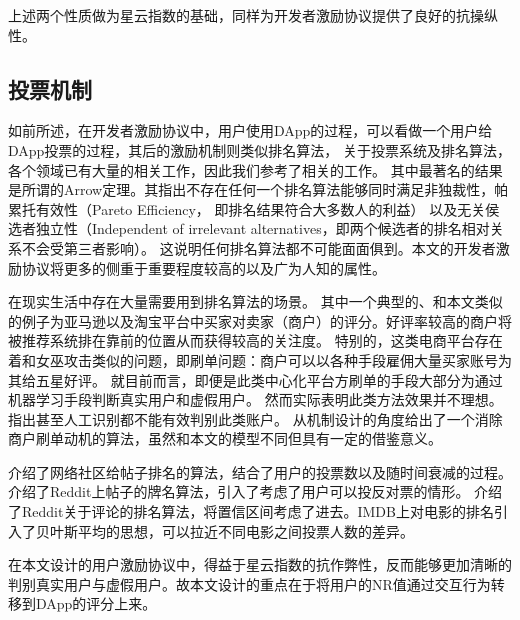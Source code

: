 \noindent 上述两个性质做为星云指数的基础，同样为开发者激励协议提供了良好的抗操纵性。

\subsection{投票机制}
如前所述，在开发者激励协议中，用户使用DApp的过程，可以看做一个用户给DApp投票的过程，其后的激励机制则类似排名算法，
关于投票系统及排名算法，各个领域已有大量的相关工作，因此我们参考了相关的工作。
其中最著名的结果是所谓的Arrow定理\cite{arrow1951extension}。其指出不存在任何一个排名算法能够同时满足非独裁性，帕累托有效性（Pareto Efficiency， 即排名结果符合大多数人的利益）
以及无关侯选者独立性（Independent of irrelevant alternatives，即两个候选者的排名相对关系不会受第三者影响）。
这说明任何排名算法都不可能面面俱到。本文的开发者激励协议将更多的侧重于重要程度较高的以及广为人知的属性。

在现实生活中存在大量需要用到排名算法的场景。
其中一个典型的、和本文类似的例子为亚马逊以及淘宝平台中买家对卖家（商户）的评分。好评率较高的商户将被推荐系统排在靠前的位置从而获得较高的关注度。
特别的，这类电商平台存在着和女巫攻击类似的问题，即刷单问题：商户可以以各种手段雇佣大量买家账号为其给五星好评。
就目前而言，即便是此类中心化平台方刷单的手段大部分为通过机器学习手段判断真实用户和虚假用户\cite{mukherjee2013spotting,jindal2008opinion,yoo2009comparison}。
然而实际表明此类方法效果并不理想。\cite{ott2011finding}指出甚至人工识别都不能有效判别此类账户。
\cite{cai2016mechanism}从机制设计的角度给出了一个消除商户刷单动机的算法，虽然和本文的模型不同但具有一定的借鉴意义。


\cite{salihefendic2010hacker}介绍了网络社区给帖子排名的算法，结合了用户的投票数以及随时间衰减的过程。
\cite{salihefendic2010reddit}介绍了Reddit上帖子的牌名算法，引入了考虑了用户可以投反对票的情形。
\cite{miller2009how}介绍了Reddit关于评论的排名算法，将置信区间考虑了进去。IMDB\cite{IMDB}上对电影的排名引入了贝叶斯平均的思想，可以拉近不同电影之间投票人数的差异。

在本文设计的用户激励协议中，得益于星云指数的抗作弊性，反而能够更加清晰的判别真实用户与虚假用户。故本文设计的重点在于将用户的NR值通过交互行为转移到DApp的评分上来。




